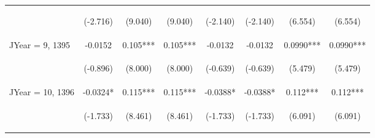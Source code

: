 \documentclass[]{article}
\begin{document}
\begin{center}
\begin{tabular}{lccccccc}
\vspace{4pt} & \begin{footnotesize}(-2.716)\end{footnotesize} & \begin{footnotesize}(9.040)\end{footnotesize} & \begin{footnotesize}(9.040)\end{footnotesize} & \begin{footnotesize}(-2.140)\end{footnotesize} & \begin{footnotesize}(-2.140)\end{footnotesize} & \begin{footnotesize}(6.554)\end{footnotesize} & \begin{footnotesize}(6.554)\end{footnotesize} \\
JYear = 9, 1395 & -0.0152 & 0.105*** & 0.105*** & -0.0132 & -0.0132 & 0.0990*** & 0.0990*** \\
\vspace{4pt} & \begin{footnotesize}(-0.896)\end{footnotesize} & \begin{footnotesize}(8.000)\end{footnotesize} & \begin{footnotesize}(8.000)\end{footnotesize} & \begin{footnotesize}(-0.639)\end{footnotesize} & \begin{footnotesize}(-0.639)\end{footnotesize} & \begin{footnotesize}(5.479)\end{footnotesize} & \begin{footnotesize}(5.479)\end{footnotesize} \\
JYear = 10, 1396 & -0.0324* & 0.115*** & 0.115*** & -0.0388* & -0.0388* & 0.112*** & 0.112*** \\
\vspace{4pt} & \begin{footnotesize}(-1.733)\end{footnotesize} & \begin{footnotesize}(8.461)\end{footnotesize} & \begin{footnotesize}(8.461)\end{footnotesize} & \begin{footnotesize}(-1.733)\end{footnotesize} & \begin{footnotesize}(-1.733)\end{footnotesize} & \begin{footnotesize}(6.091)\end{footnotesize} & \begin{footnotesize}(6.091)\end{footnotesize} \\

\end{tabular}
\end{center}
\end{document}
